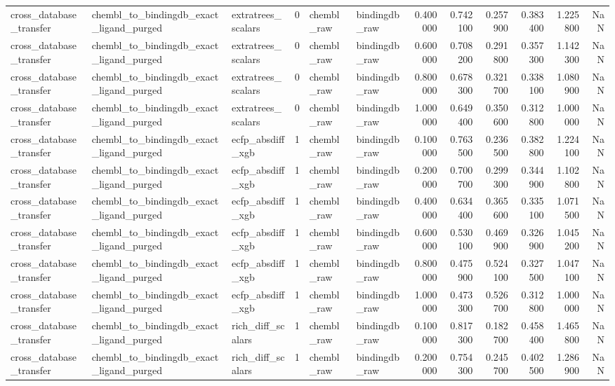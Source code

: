 \begin{longtable}{lllrllrrrrrr}
cross\_database\_transfer & chembl\_to\_bindingdb\_exact\_ligand\_purged & extratrees\_scalars & 0 & chembl\_raw & bindingdb\_raw & 0.400000 & 0.742100 & 0.257900 & 0.383400 & 1.225800 & NaN \\
cross\_database\_transfer & chembl\_to\_bindingdb\_exact\_ligand\_purged & extratrees\_scalars & 0 & chembl\_raw & bindingdb\_raw & 0.600000 & 0.708200 & 0.291800 & 0.357300 & 1.142300 & NaN \\
cross\_database\_transfer & chembl\_to\_bindingdb\_exact\_ligand\_purged & extratrees\_scalars & 0 & chembl\_raw & bindingdb\_raw & 0.800000 & 0.678300 & 0.321700 & 0.338100 & 1.080900 & NaN \\
cross\_database\_transfer & chembl\_to\_bindingdb\_exact\_ligand\_purged & extratrees\_scalars & 0 & chembl\_raw & bindingdb\_raw & 1.000000 & 0.649400 & 0.350600 & 0.312800 & 1.000000 & NaN \\
cross\_database\_transfer & chembl\_to\_bindingdb\_exact\_ligand\_purged & ecfp\_absdiff\_xgb & 1 & chembl\_raw & bindingdb\_raw & 0.100000 & 0.763500 & 0.236500 & 0.382800 & 1.224100 & NaN \\
cross\_database\_transfer & chembl\_to\_bindingdb\_exact\_ligand\_purged & ecfp\_absdiff\_xgb & 1 & chembl\_raw & bindingdb\_raw & 0.200000 & 0.700700 & 0.299300 & 0.344900 & 1.102800 & NaN \\
cross\_database\_transfer & chembl\_to\_bindingdb\_exact\_ligand\_purged & ecfp\_absdiff\_xgb & 1 & chembl\_raw & bindingdb\_raw & 0.400000 & 0.634400 & 0.365600 & 0.335100 & 1.071500 & NaN \\
cross\_database\_transfer & chembl\_to\_bindingdb\_exact\_ligand\_purged & ecfp\_absdiff\_xgb & 1 & chembl\_raw & bindingdb\_raw & 0.600000 & 0.530100 & 0.469900 & 0.326900 & 1.045200 & NaN \\
cross\_database\_transfer & chembl\_to\_bindingdb\_exact\_ligand\_purged & ecfp\_absdiff\_xgb & 1 & chembl\_raw & bindingdb\_raw & 0.800000 & 0.475900 & 0.524100 & 0.327500 & 1.047100 & NaN \\
cross\_database\_transfer & chembl\_to\_bindingdb\_exact\_ligand\_purged & ecfp\_absdiff\_xgb & 1 & chembl\_raw & bindingdb\_raw & 1.000000 & 0.473300 & 0.526700 & 0.312800 & 1.000000 & NaN \\
cross\_database\_transfer & chembl\_to\_bindingdb\_exact\_ligand\_purged & rich\_diff\_scalars & 1 & chembl\_raw & bindingdb\_raw & 0.100000 & 0.817300 & 0.182700 & 0.458400 & 1.465800 & NaN \\
cross\_database\_transfer & chembl\_to\_bindingdb\_exact\_ligand\_purged & rich\_diff\_scalars & 1 & chembl\_raw & bindingdb\_raw & 0.200000 & 0.754300 & 0.245700 & 0.402500 & 1.286900 & NaN \\

\end{longtable}
